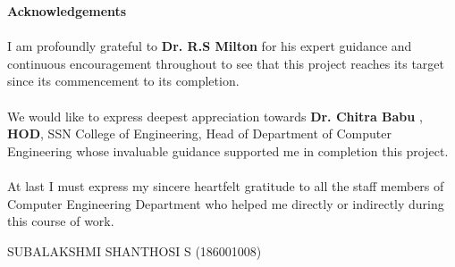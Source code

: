 \begin{center}
\thispagestyle{empty}
\LARGE{\textbf{Acknowledgements}}\\[1cm]
\end{center}
\linespread{1.13}
\large{\paragraph{}I am profoundly grateful to \textbf{Dr. R.S Milton } for his expert guidance
and continuous encouragement throughout to see that this project reaches its
target since its commencement to its completion.}
\large{\paragraph{}We would like to express deepest appreciation towards \textbf{Dr. Chitra Babu },
\textbf{HOD}, SSN College of Engineering, Head of Department of Computer Engineering whose invaluable guidance supported me in completion this project.}
\large{\paragraph{}At last I must express my sincere heartfelt gratitude to all the staff members
of Computer Engineering Department who helped me directly or indirectly during this course of work.}
\vspace*{8cm}
\begin{flushright}
{
SUBALAKSHMI SHANTHOSI S (186001008)\\

}
\end{flushright}
\newpage
